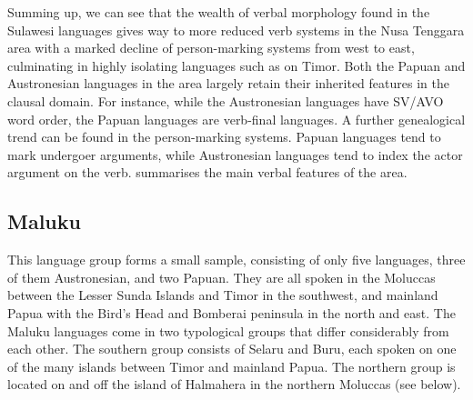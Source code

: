 Summing up, we can see that the wealth of verbal morphology found in the Sulawesi languages gives way to more reduced verb systems in the Nusa Tenggara area with a marked decline of person-marking systems from west to east, culminating in highly isolating languages such as  on Timor. Both the Papuan and Austronesian languages in the area largely retain their inherited features in the clausal domain. For instance, while the Austronesian languages have SV/AVO word order, the Papuan languages are verb-final languages. A further genealogical trend can be found in the person-marking systems. Papuan languages tend to mark undergoer arguments, while Austronesian languages tend to index the actor argument on the verb.  summarises the main verbal features of the area.

\begin{table}[h]
\caption[Basic verbal features of Nusa Tenggara languages]{Overview of basic verbal features of the Nusa Tenggara languages in the EI data set. Constituent order lists only the basic pattern, pragmatically induced alternative patterns are often also possible. Brackets around person marking formulae indicate that the system does not apply to all verbs in all contexts. Grouping of languages is roughly according to the discussion in the prose.}
\label{table:overviewnusa}
\end{table}

\subsection{Maluku} \label{sec:maluku}

This language group forms a small sample, consisting of only five languages, three of them Austronesian, and two Papuan. They are all spoken in the Moluccas between the Lesser Sunda Islands and Timor in the southwest, and mainland Papua with the Bird's Head and Bomberai peninsula in the north and east. The Maluku languages come in two typological groups that differ considerably from each other. The southern group consists of Selaru and Buru, each spoken on one of the many islands between Timor and mainland Papua. The northern group is located on and off the island of Halmahera in the northern Moluccas (see  below).

